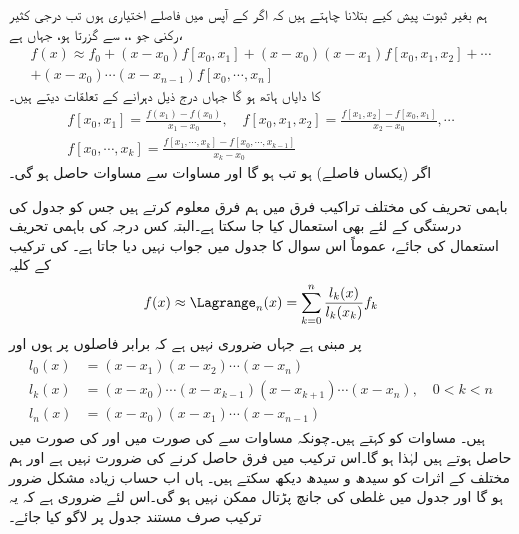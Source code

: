 ہم بغیر ثبوت پیش کیے بتلانا چاہتے ہیں کہ اگر  کے آپس میں فاصلے اختیاری ہوں تب  درجی کثیر رکنی جو ،، سے گزرتا ہو، جہاں  ہے،   
\begin{multline}\label{مساوات_اعدادی_نیوٹن_منقسم_فرق_الف}
f(x)\approx f_0+(x-x_0)f[x_0,x_1]+(x-x_0)(x-x_1)f[x_0,x_1,x_2]+\cdots\\
+(x-x_0)\cdots (x-x_{n-1})f[x_0,\cdots,x_n]
\end{multline}
 کا دایاں ہاتھ ہو گا جہاں   درج ذیل  دہرانے کے تعلقات دیتے ہیں۔
\begin{multline}\label{مساوات_اعدادی_نیوٹن_منقسم_فرق_ب}
f[x_0,x_1]=\frac{f(x_1)-f(x_0)}{x_1-x_0},\quad f[x_0,x_1,x_2]=\frac{f[x_1,x_2]-f[x_0,x_1]}{x_2-x_0},\cdots\\
f[x_0,\cdots,x_k]=\frac{f[x_1,\cdots,x_k]-f[x_0,\cdots,x_{k-1}]}{x_k-x_0}
\end{multline}
اگر  (یکساں فاصلے) ہو تب  ہو گا اور  مساوات  سے  مساوات  حاصل ہو گی۔


باہمی تحریف کی مختلف تراکیب  فرق میں ہم فرق معلوم کرتے ہیں جس کو جدول کی درستگی کے لئے بھی استعمال کیا جا سکتا ہے۔البتہ کس درجہ کی باہمی تحریف استعمال کی جائے،  عموماً اس سوال کا جدول میں جواب نہیں دیا جاتا ہے۔ کی ترکیب  کے کلیہ
\begin{align}\label{مساوات_اعدادی_لیگرینج_الف}
f(x)\approx \Lagrange_n(x)=\sum\limits_{k=0}^{n}\frac{l_k(x)}{l_k(x_k)}f_k
\end{align}
پر مبنی ہے جہاں ضروری نہیں ہے کہ  برابر فاصلوں پر ہوں اور
\begin{gather}
\begin{aligned}\label{مساوات_اعدادی_لیگرینج_ب}
l_0(x)&=(x-x_1)(x-x_2)\cdots(x-x_n)\\
l_k(x)&=(x-x_0)\cdots(x-x_{k-1})(x-x_{k+1})\cdots(x-x_n),\quad 0<k<n\\
l_n(x)&=(x-x_0)(x-x_1)\cdots(x-x_{n-1})
\end{aligned}
\end{gather}
ہیں۔ مساوات  کو  کہتے ہیں۔چونکہ مساوات  سے  کی صورت میں   اور  کی صورت میں  حاصل ہوتے ہیں  لہٰذا  ہو گا۔اس ترکیب میں فرق حاصل کرنے کی ضرورت نہیں ہے اور ہم مختلف  کے اثرات کو سیدھ و سیدھ دیکھ سکتے ہیں۔ ہاں اب حساب زیادہ مشکل ضرور ہو گا اور جدول میں غلطی کی جانچ پڑتال ممکن نہیں ہو گی۔اس لئے ضروری ہے کہ یہ ترکیب صرف مستند جدول پر لاگو کیا جائے۔

